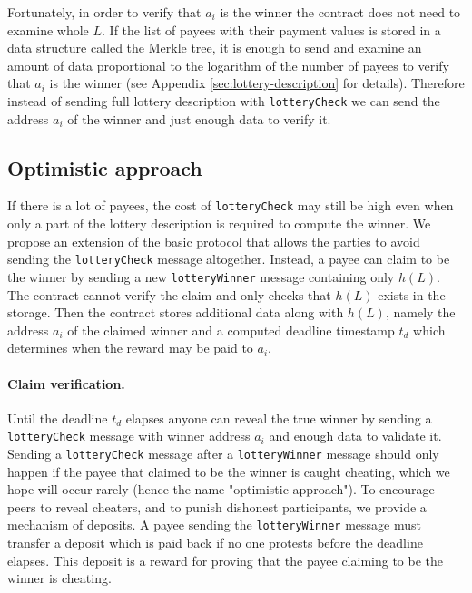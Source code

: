 \documentclass[a4paper]{article}
\begin{document}
    Fortunately, in order to verify that $a_i$ is the winner the contract does not need to examine whole $L$.
    If the list of payees with their payment values is stored in a data structure called the Merkle tree, it is
    enough to send and examine an amount of data proportional to the logarithm of the number of payees to verify
    that $a_i$ is the winner (see Appendix \ref{sec:lottery-description} for details). Therefore instead of sending
    full lottery description with \texttt{lotteryCheck} we can send the address $a_i$ of the winner and just enough
    data to verify it.

\subsection{Optimistic approach}
    If there is a lot of payees, the cost of \texttt{lotteryCheck} may still be high even when only a part of the
    lottery description is required to compute the winner. We propose an extension of the basic protocol that allows
    the parties to avoid sending the \texttt{lotteryCheck} message altogether. Instead, a payee can claim to be the
    winner by sending a new \texttt{lotteryWinner} message containing only $h(L)$. The contract cannot verify the
    claim and only checks that $h(L)$ exists in the storage. Then the contract stores additional data along with
    $h(L)$, namely the address $a_i$ of the claimed winner and a computed deadline timestamp $t_d$ which determines
    when the reward may be paid to $a_i$.

    \paragraph{Claim verification.}
    Until the deadline $t_d$ elapses anyone can reveal the true winner by sending a \texttt{lotteryCheck} message with
    winner address $a_i$ and enough data to validate it. Sending a \texttt{lotteryCheck} message after a
    \texttt{lotteryWinner} message should only happen if the payee that claimed to be the winner is caught cheating,
    which we hope will occur rarely (hence the name "optimistic approach"). To encourage peers to reveal cheaters,
    and to punish dishonest participants, we provide a mechanism of deposits. A payee sending the \texttt{lotteryWinner}
    message must transfer a deposit which is paid back if no one protests before the deadline elapses.
    This deposit is a reward for proving that the payee claiming to be the winner is cheating.
\end{document}

